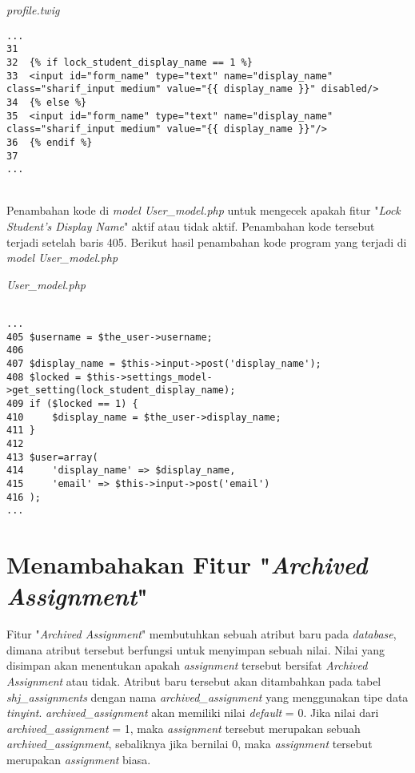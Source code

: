 \textit{profile.twig}
\begin{lstlisting}[basicstyle=\ttfamily, frame=single,
columns=fullflexible, keepspaces=true, breaklines=true]
...
31
32	{% if lock_student_display_name == 1 %}
33	<input id="form_name" type="text" name="display_name" class="sharif_input medium" value="{{ display_name }}" disabled/>
34	{% else %}
35	<input id="form_name" type="text" name="display_name" class="sharif_input medium" value="{{ display_name }}"/>
36	{% endif %}
37
...
\end{lstlisting}
~\\
Penambahan kode di \textit{model User\_model.php} untuk mengecek apakah fitur "\textit{Lock Student's Display Name}" aktif atau tidak aktif. Penambahan kode tersebut terjadi setelah baris 405. Berikut hasil penambahan kode program yang terjadi di \textit{model User\_model.php}

\textit{User\_model.php}
\begin{lstlisting}[basicstyle=\ttfamily, frame=single,
columns=fullflexible, keepspaces=true, breaklines=true]

...
405	$username = $the_user->username;
406
407	$display_name = $this->input->post('display_name');
408	$locked = $this->settings_model->get_setting(lock_student_display_name);
409	if ($locked == 1) {
410		$display_name = $the_user->display_name;
411	}
412	
413	$user=array(
414		'display_name' => $display_name,
415		'email' => $this->input->post('email')
416	);
...
\end{lstlisting}

\section{Menambahakan Fitur "\textit{Archived Assignment}"}
Fitur "\textit{Archived Assignment}" membutuhkan sebuah atribut baru pada \textit{database}, dimana atribut tersebut berfungsi untuk menyimpan sebuah nilai. Nilai yang disimpan akan menentukan apakah \textit{assignment} tersebut bersifat \textit{Archived Assignment} atau tidak. Atribut baru tersebut akan ditambahkan pada tabel \textit{shj\_assignments} dengan nama \textit{archived\_assignment} yang menggunakan tipe data \textit{tinyint}. \textit{archived\_assignment} akan memiliki nilai \textit{default} = 0. Jika nilai dari \textit{archived\_assignment} = 1, maka \textit{assignment} tersebut merupakan sebuah \textit{archived\_assignment}, sebaliknya jika bernilai 0, maka \textit{assignment} tersebut merupakan \textit{assignment} biasa.

